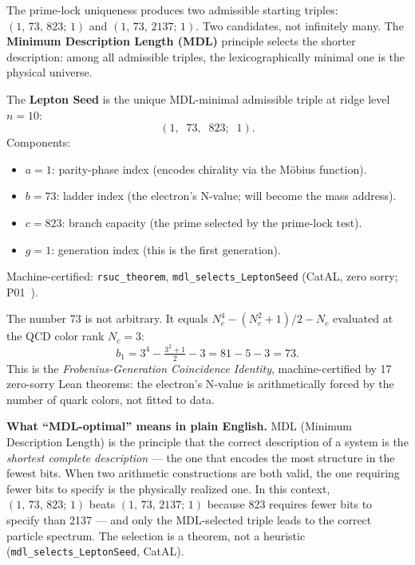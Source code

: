 \documentclass[11pt,a4paper]{article}
\newcommand{\term}[1]{\textbf{#1}}
\newcommand{\lean}[1]{\texttt{#1}}
\newcommand{\Nc}{N_c}
\newcommand{\CatAL}{\textsf{CatAL}}
\begin{document}
{\sloppy
The prime-lock uniqueness produces two admissible starting triples:
$(1,\,73,\,823;\,1)$ and $(1,\,73,\,2137;\,1)$.  Two candidates, not infinitely
many.  The \term{Minimum Description Length (MDL)} principle selects the shorter
description: among all admissible triples, the lexicographically minimal one is the
physical universe.
\par}

\begin{tcolorbox}[colback=boxgreen,colframe=green!50!black,title=The Lepton Seed]
The \term{Lepton Seed} is the unique MDL-minimal admissible triple at ridge level
$n = 10$:
\[
  (1,\;\;73,\;\;823;\;\;1).
\]
Components:
\begin{itemize}[itemsep=1pt]
  \item $a = 1$: parity-phase index (encodes chirality via the M\"{o}bius function).
  \item $b = 73$: ladder index (the electron's N-value; will become the mass address).
  \item $c = 823$: branch capacity (the prime selected by the prime-lock test).
  \item $g = 1$: generation index (this is the first generation).
\end{itemize}
Machine-certified: \lean{rsuc\_theorem}, \lean{mdl\_selects\_LeptonSeed}
(\CatAL, zero sorry; P01~\cite{SpivackSM}).
\end{tcolorbox}

The number 73 is not arbitrary.  It equals $\Nc^4 - (\Nc^2+1)/2 - \Nc$ evaluated at
the QCD color rank $\Nc = 3$:
\[
  b_1 = 3^4 - \tfrac{3^2+1}{2} - 3 = 81 - 5 - 3 = 73.
\]
This is the \emph{Frobenius-Generation Coincidence Identity}, machine-certified by
17 zero-sorry Lean theorems: the electron's N-value is arithmetically forced by
the number of quark colors, not fitted to data.

\medskip
\noindent\textbf{What ``MDL-optimal'' means in plain English.}\enspace
MDL (Minimum Description Length) is the principle that the correct description of a
system is the \emph{shortest complete description} --- the one that encodes the most
structure in the fewest bits.  When two arithmetic constructions are both valid, the
one requiring fewer bits to specify is the physically realized one.  In this context,
$(1,\,73,\,823;\,1)$ beats $(1,\,73,\,2137;\,1)$ because 823 requires fewer bits to
specify than 2137 --- and only the MDL-selected triple leads to the correct particle
spectrum.  The selection is a theorem, not a heuristic
(\lean{mdl\_selects\_LeptonSeed}, \CatAL).
\end{document}
